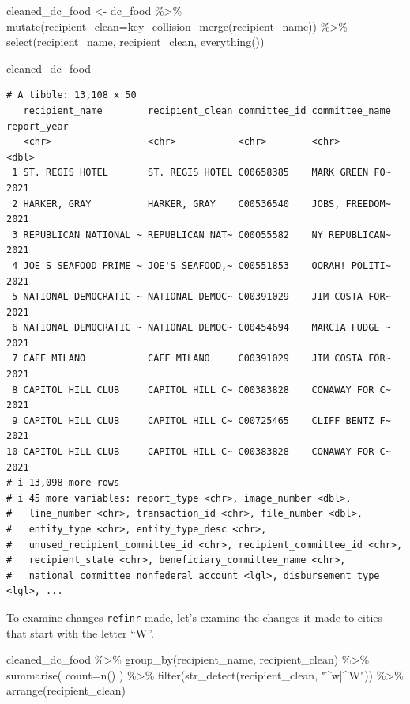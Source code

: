 \documentclass[
  letterpaper,
  DIV=11,
  numbers=noendperiod]{scrreprt}
\newenvironment{Shaded}{\begin{snugshade}}{\end{snugshade}}
\newcommand{\AttributeTok}[1]{\textcolor[rgb]{0.40,0.45,0.13}{#1}}
\newcommand{\FunctionTok}[1]{\textcolor[rgb]{0.28,0.35,0.67}{#1}}
\newcommand{\NormalTok}[1]{\textcolor[rgb]{0.00,0.23,0.31}{#1}}
\newcommand{\OtherTok}[1]{\textcolor[rgb]{0.00,0.23,0.31}{#1}}
\newcommand{\SpecialCharTok}[1]{\textcolor[rgb]{0.37,0.37,0.37}{#1}}
\newcommand{\StringTok}[1]{\textcolor[rgb]{0.13,0.47,0.30}{#1}}
\begin{document}
\begin{Shaded}
\begin{Highlighting}[]
\NormalTok{cleaned\_dc\_food }\OtherTok{\textless{}{-}}\NormalTok{ dc\_food }\SpecialCharTok{\%\textgreater{}\%}
  \FunctionTok{mutate}\NormalTok{(}\AttributeTok{recipient\_clean=}\FunctionTok{key\_collision\_merge}\NormalTok{(recipient\_name)) }\SpecialCharTok{\%\textgreater{}\%}
  \FunctionTok{select}\NormalTok{(recipient\_name, recipient\_clean, }\FunctionTok{everything}\NormalTok{())}

\NormalTok{cleaned\_dc\_food}
\end{Highlighting}
\end{Shaded}

\begin{verbatim}
# A tibble: 13,108 x 50
   recipient_name        recipient_clean committee_id committee_name report_year
   <chr>                 <chr>           <chr>        <chr>                <dbl>
 1 ST. REGIS HOTEL       ST. REGIS HOTEL C00658385    MARK GREEN FO~        2021
 2 HARKER, GRAY          HARKER, GRAY    C00536540    JOBS, FREEDOM~        2021
 3 REPUBLICAN NATIONAL ~ REPUBLICAN NAT~ C00055582    NY REPUBLICAN~        2021
 4 JOE'S SEAFOOD PRIME ~ JOE'S SEAFOOD,~ C00551853    OORAH! POLITI~        2021
 5 NATIONAL DEMOCRATIC ~ NATIONAL DEMOC~ C00391029    JIM COSTA FOR~        2021
 6 NATIONAL DEMOCRATIC ~ NATIONAL DEMOC~ C00454694    MARCIA FUDGE ~        2021
 7 CAFE MILANO           CAFE MILANO     C00391029    JIM COSTA FOR~        2021
 8 CAPITOL HILL CLUB     CAPITOL HILL C~ C00383828    CONAWAY FOR C~        2021
 9 CAPITOL HILL CLUB     CAPITOL HILL C~ C00725465    CLIFF BENTZ F~        2021
10 CAPITOL HILL CLUB     CAPITOL HILL C~ C00383828    CONAWAY FOR C~        2021
# i 13,098 more rows
# i 45 more variables: report_type <chr>, image_number <dbl>,
#   line_number <chr>, transaction_id <chr>, file_number <dbl>,
#   entity_type <chr>, entity_type_desc <chr>,
#   unused_recipient_committee_id <chr>, recipient_committee_id <chr>,
#   recipient_state <chr>, beneficiary_committee_name <chr>,
#   national_committee_nonfederal_account <lgl>, disbursement_type <lgl>, ...
\end{verbatim}

To examine changes \texttt{refinr} made, let's examine the changes it
made to cities that start with the letter ``W''.

\begin{Shaded}
\begin{Highlighting}[]
\NormalTok{cleaned\_dc\_food }\SpecialCharTok{\%\textgreater{}\%}
  \FunctionTok{group\_by}\NormalTok{(recipient\_name, recipient\_clean) }\SpecialCharTok{\%\textgreater{}\%}
  \FunctionTok{summarise}\NormalTok{(}
    \AttributeTok{count=}\FunctionTok{n}\NormalTok{()}
\NormalTok{  ) }\SpecialCharTok{\%\textgreater{}\%}
  \FunctionTok{filter}\NormalTok{(}\FunctionTok{str\_detect}\NormalTok{(recipient\_clean, }\StringTok{"\^{}w|\^{}W"}\NormalTok{)) }\SpecialCharTok{\%\textgreater{}\%}
  \FunctionTok{arrange}\NormalTok{(recipient\_clean)}
\end{Highlighting}
\end{Shaded}
\end{document}
